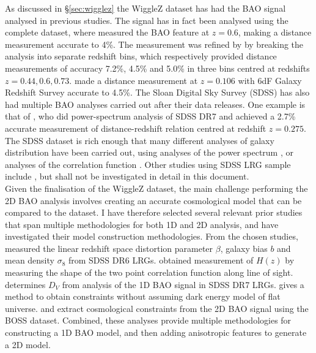 \documentclass[titlesmallcaps, examinerscopy, copyrightpage]{uqthesis}
\begin{document}
As discussed in \S\ref{sec:wigglez} the WiggleZ dataset has had the BAO signal analysed in previous studies. The signal has in fact been analysed using the complete dataset, where \citet{BlakeKazin2011} measured the BAO feature at $z=0.6$, making a distance measurement accurate to 4\%. The measurement was refined by  \citet{BlakeDavis2011} by breaking the analysis into separate redshift bins, which respectively provided distance measurements of accuracy 7.2\%, 4.5\% and 5.0\% in three bins centred at redshifts $z=0.44,0.6,0.73$. \citet{BeutlerBlake2011} made a distance measurement at $z=0.106$ with 6dF Galaxy Redshift Survey \cite[6dFGRS:][]{JonesRead2009} accurate to 4.5\%. The Sloan Digital Sky Survey (SDSS) has also had multiple BAO analyses carried out after their data releases. One example is that of \citet{PercivalReid2010}, who did power-spectrum analysis of SDSS DR7 and achieved a 2.7\% accurate measurement of distance-redshift relation centred at redshift $z=0.275$. The SDSS dataset is rich enough that many different analyses of galaxy distribution have been carried out, using analyses of the power spectrum \citep{TegmarkBlanton2004,Huetsi2005,BlakeCollister2007,Padmanabhan2007, PercivalCole2007,PercivalReid2010, ReidPercival2010}, or analyses of the correlation function \citep{EisensteinZehavi2005, Sanchez2009, OkumuraMatsubara2008, CabreGaztanaga2009, Martinez2009,KazinBlanton2010,ChuangWangHemantha2012}. Other studies using SDSS LRG sample include \citet{Huetsi2006, PercivalNichol2007,Sanchez2009, KazinBlanton2010}, but shall not be investigated in detail in this document.\\





Given the finalisation of the WiggleZ dataset, the main challenge performing the 2D BAO analysis involves creating an accurate cosmological model that can be compared to the dataset. I have therefore selected several relevant prior studies that span multiple methodologies for both 1D and 2D analysis, and have investigated their model construction methodologies. From the chosen studies, \citet{CabreGaztanaga2009} measured the linear redshift space distortion parameter $\beta$, galaxy bias $b$ and mean density $\sigma_8$ from SDSS DR6 LRGs. \citet{Gaztanaga2009} obtained measurement of $H(z)$ by measuring the shape of the two point correlation function along line of sight. \citet{KazinBlanton2010} determines $D_V$ from analysis of the 1D BAO signal in SDSS DR7 LRGs. \citet{ChuangWangHemantha2012} gives a method to obtain constraints without assuming dark energy model of flat universe. \citet{SanchezKazinBeutler2013} and \citet{Kazin2010} extract cosmological constraints from the 2D BAO signal using the BOSS dataset. Combined, these analyses provide multiple methodologies for constructing a 1D BAO model, and then adding anisotropic features to generate a 2D model.
\end{document}
